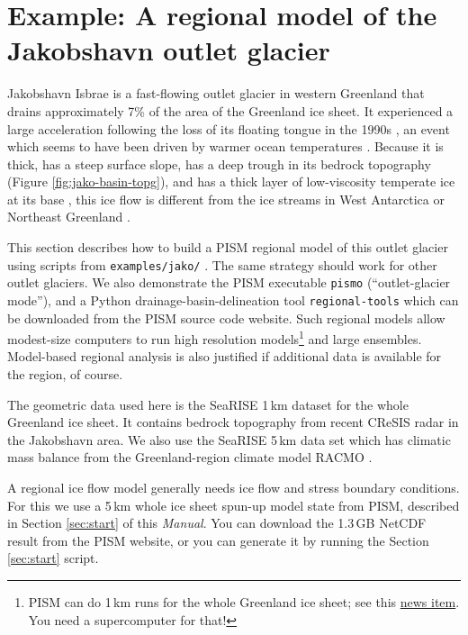 
\section{Example: A regional model of the Jakobshavn outlet glacier}\label{sec:jako}  


Jakobshavn Isbrae is a fast-flowing outlet glacier in western Greenland that drains approximately 7\% of the area of the Greenland ice sheet.  It experienced a large acceleration following the loss of its floating tongue in the 1990s \cite{JoughinAbdalatiFahnestock}, an event which seems to have been driven by warmer ocean temperatures \cite{Hollandetal2008}.  Because it is thick, has a steep surface slope, has a deep trough in its bedrock topography (Figure \ref{fig:jako-basin-topg}), and has a thick layer of low-viscosity temperate ice at its base \cite{Luethietal2009}, this ice flow is different from the ice streams in West Antarctica or Northeast Greenland \cite{TrufferEchelmeyer}.
 
This section describes how to build a PISM regional model of this outlet glacier using scripts from \texttt{examples/jako/} \cite{DellaGiustina2011}.  The same strategy should work for other outlet glaciers.  We also demonstrate the PISM executable \texttt{pismo} (``outlet-glacier mode''), and a Python drainage-basin-delineation tool \texttt{regional-tools} which can be downloaded from the PISM source code website.  Such regional models allow modest-size computers to run high resolution models\footnote{PISM can do 1\,km runs for the whole Greenland ice sheet; see this \href{http://www.pism-docs.org/wiki/doku.php?id=news:first1km}{news item}.  You need a supercomputer for that!} and large ensembles.  Model-based regional analysis is also justified if additional data is available for the region, of course.

The geometric data used here is the SeaRISE  \cite{Bindshadler2012SeaRISE} 1\,km dataset for the whole Greenland ice sheet.  It contains bedrock topography from recent CReSIS radar in the Jakobshavn area.  We also use the SeaRISE 5\,km data set which has climatic mass balance from the Greenland-region climate model RACMO \cite{Ettemaetal2009}.

A regional ice flow model generally needs ice flow and stress boundary conditions.  For this we use a 5\,km whole ice sheet spun-up model state from PISM, described in Section \ref{sec:start} of this \emph{Manual}.  You can download the 1.3\,GB NetCDF result from the PISM website, or you can generate it by running the Section \ref{sec:start} script. 

